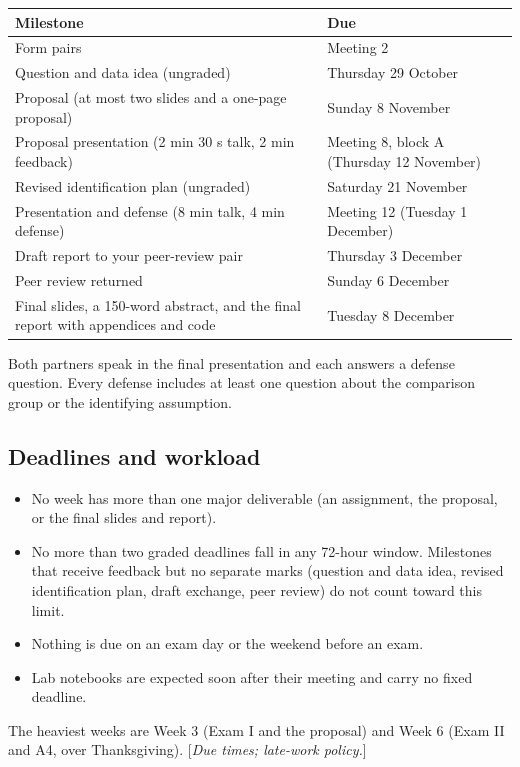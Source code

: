\documentclass[11pt]{article}
\newcommand{\tbd}[1]{\textcolor{warnred}{[\emph{#1}]}}
\begin{document}
\begin{center}
\small
\begin{tabular}{L{7.6cm}L{7.4cm}}
\toprule
\textbf{Milestone} & \textbf{Due} \\
\midrule
Form pairs & Meeting 2 \\
Question and data idea (ungraded) & Thursday 29 October \\
Proposal (at most two slides and a one-page proposal) & Sunday 8 November \\
Proposal presentation (2 min 30 s talk, 2 min feedback) & Meeting 8, block A (Thursday 12 November) \\
Revised identification plan (ungraded) & Saturday 21 November \\
Presentation and defense (8 min talk, 4 min defense) & Meeting 12 (Tuesday 1 December) \\
Draft report to your peer-review pair & Thursday 3 December \\
Peer review returned & Sunday 6 December \\
Final slides, a 150-word abstract, and the final report with appendices and code & Tuesday 8 December \\
\bottomrule
\end{tabular}
\end{center}

Both partners speak in the final presentation and each answers a defense question. Every defense
includes at least one question about the comparison group or the identifying assumption.

\subsection*{Deadlines and workload}

\begin{itemize}
    \item No week has more than one major deliverable (an assignment, the proposal, or the final slides
    and report).
    \item No more than two graded deadlines fall in any 72-hour window. Milestones that receive
    feedback but no separate marks (question and data idea, revised identification plan, draft
    exchange, peer review) do not count toward this limit.
    \item Nothing is due on an exam day or the weekend before an exam.
    \item Lab notebooks are expected soon after their meeting and carry no fixed deadline.
\end{itemize}
The heaviest weeks are Week 3 (Exam I and the proposal) and Week 6 (Exam II and A4, over
Thanksgiving). \tbd{Due times; late-work policy.}
\end{document}
